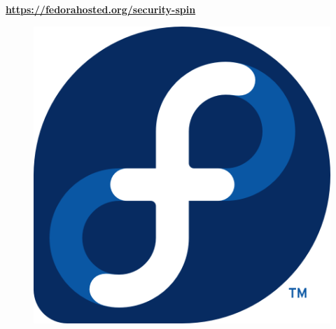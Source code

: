 \begin{frame}
\frametitle{}
\begin{center}
\vspace{2em}
{\Large \textbf{\href{https://fedorahosted.org/security-spin}{https://fedorahosted.org/security-spin}}}
\vspace{1em}
\begin{figure}
  \begin{center}
    \includegraphics{fedora-logo2.png}
  \end{center}
\end{figure}
\end{center}
\end{frame}

